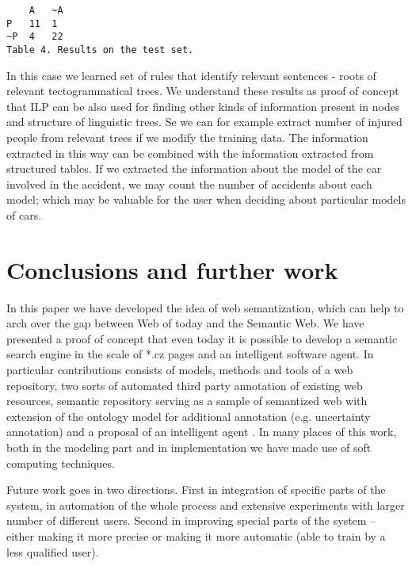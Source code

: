 \documentclass{sig-alternate}
\begin{document}
\begin{verbatim}
	A	~A
P	11	1
~P	4	22
Table 4. Results on the test set.
\end{verbatim}


In this case we learned set of rules that identify relevant sentences - roots of relevant tectogrammatical trees. We understand these results as proof of concept that ILP can be also used for finding other kinds of information present in nodes and structure of linguistic trees. Se we can for example extract number of injured people from relevant trees if we modify the training data. 
The information extracted in this way can be combined with the information extracted from structured tables. If we extracted the information about the model of the car involved in the accident, we may count the number of accidents about each model; which may be valuable for the user when deciding about particular models of cars. 



\section{Conclusions and further work}
In this paper we have developed the idea of web semantization, which can help to arch over the gap between Web of today and the Semantic Web. We have presented a proof of concept that even today it is possible to develop a semantic search engine in the scale of *.cz pages and an intelligent software agent. In particular contributions consists of models, methods and tools of a web repository, two sorts of automated third party annotation of existing web resources, semantic repository serving as a sample of semantized web with extension of the ontology model for additional annotation (e.g. uncertainty annotation) and a proposal of an intelligent agent . In many places of this work, both in the modeling part and in implementation we have made use of soft computing techniques. 

Future work goes in two directions. First in integration of specific parts of the system,  in automation of the whole process and extensive experiments with larger number of different users. Second in improving special parts of the system -- either making it more precise or making it more automatic (able to train by a less qualified user).

\end{document}
